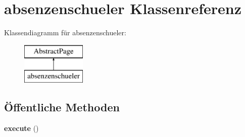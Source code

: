 \hypertarget{classabsenzenschueler}{}\section{absenzenschueler Klassenreferenz}
\label{classabsenzenschueler}
Klassendiagramm für absenzenschueler\+:\begin{figure}[H]
\begin{center}
\leavevmode
\includegraphics[height=2.000000cm]{classabsenzenschueler}
\end{center}
\end{figure}
\subsection*{Öffentliche Methoden}
\begin{DoxyCompactItemize}
\item 
\mbox{\label{classabsenzenschueler_a1e04f9bfcd57b282e197fef0ded379ce}} 
{\bfseries execute} ()
\end{DoxyCompactItemize}
